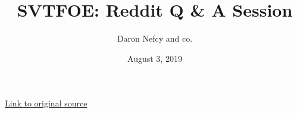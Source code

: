 \title{SVTFOE: Reddit Q \& A Session}
\author{Daron Nefcy and co.}
\date{August 3, 2019}
\maketitle
{}
\tableofcontents
\vfill
{\hfill \href{https://www.reddit.com/r/StarVStheForcesofEvil/comments/clnrdv/link_compendium_of_questions_and_answers_from_the/?}{Link to original source}\hfill}
\thispagestyle{empty}
